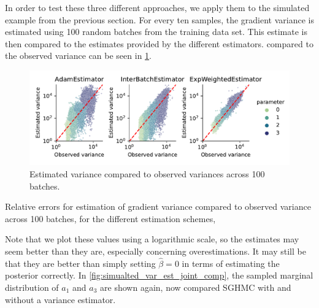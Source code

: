 In order to test these three different approaches, we apply them to the simulated example from the previous section.
For every ten samples, the gradient variance is estimated using 100 random batches from the training data set.
This estimate is then compared to the estimates provided by the different estimators. 
compared to the observed variance can be seen in \cref{fig:est_variances_simulated}.
\begin{figure}[htbp]
    \centering
    \includegraphics[width=\linewidth]{Figures/simulated_sghmc_gradient_variance_estimations.pdf}
    \caption{Estimated variance compared to observed variances across 100 batches.}
    \label{fig:est_variances_simulated}
\end{figure}
\begin{table}[htbp]
    \centering
    
    \caption{Relative errors for estimation of gradient variance compared to observed variance across 100 batches, for the different estimation schemes,}
\end{table}
Note that we plot these values using a logarithmic scale, so the estimates may seem better than they are, especially concerning overestimations. 
It may still be that they are better than simply setting $\hat\beta=0$ in terms of estimating the posterior correctly.
In \cref{fig:simualted_var_est_joint_comp}, the sampled marginal distribution of $a_1$ and $a_3$ are shown again, now compared SGHMC with and without a variance estimator.
